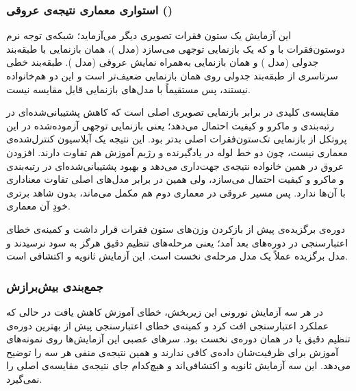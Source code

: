 \subsubsection{استواری معماری نتیجه‌ی عروقی ()}

این آزمایش یک ستون فقرات تصویری دیگر می‌آزماید؛ شبکه‌ی توجه نرم دو‌ستون‌فقرات با  و  که یک بازنمایی توجهی می‌سازد (مدل )، همان بازنمایی با طبقه‌بند جدولی (مدل ) و همان بازنمایی به‌همراه نمایش عروقی (مدل ). طبقه‌بند خطی سرتاسری  از طبقه‌بند جدولی روی همان بازنمایی ضعیف‌تر است و این دو هم‌خانواده نیستند، پس  مستقیماً با مدل‌های بازنمایی قابل مقایسه نیست.

مقایسه‌ی کلیدی  در برابر بازنمایی تصویری اصلی است که کاهش پشتیبانی‌شده‌ای در رتبه‌بندی و  ماکرو و کیفیت احتمال می‌دهد؛ یعنی بازنمایی توجهی آزموده‌شده در این پروتکل از بازنمایی تک‌ستون‌فقرات اصلی بدتر بود. این نتیجه یک آبلاسیون کنترل‌شده‌ی معماری نیست، چون دو خط لوله در یادگیرنده و رژیم آموزش هم تفاوت دارند. افزودن عروق در همین خانواده نتیجه‌ی جهت‌داری می‌دهد و بهبود پشتیبانی‌شده‌ای در رتبه‌بندی و  ماکرو و کیفیت احتمال می‌سازد، ولی همین  در برابر مدل‌های اصلی تفاوت معناداری با آن‌ها ندارد. پس مسیر عروقی در معماری دوم هم مکمل می‌ماند، بدون شاهد برتری خودِ آن معماری.

دوره‌ی برگزیده‌ی  پیش از بازکردن وزن‌های ستون فقرات قرار داشت و کمینه‌ی خطای اعتبارسنجی در دوره‌های بعد آمد؛ یعنی مرحله‌های تنظیم دقیق هرگز به سود نرسیدند و مدل برگزیده عملاً یک مدل مرحله‌ی نخست است. این آزمایش ثانویه و اکتشافی است.





\subsubsection{جمع‌بندی بیش‌برازش}

در هر سه آزمایش نورونی این زیربخش، خطای آموزش کاهش یافت در حالی که عملکرد اعتبارسنجی افت کرد و کمینه‌ی خطای اعتبارسنجی پیش از بهترین دوره‌ی تنظیم دقیق یا در همان دوره‌ی نخست بود. سرهای عصبی این آزمایش‌ها روی نمونه‌های آموزش برای ظرفیت‌شان داده‌ی کافی ندارند و همین نتیجه‌ی منفی هر سه را توضیح می‌دهد. این سه آزمایش ثانویه و اکتشافی‌اند و هیچ‌کدام جای نتیجه‌ی مقایسه‌ی اصلی را نمی‌گیرد.
